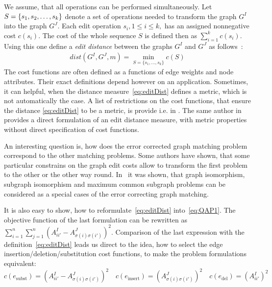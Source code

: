We assume, that all operations can be performed simultaneously. Let $S=\{s_1,s_2,\dots,\newline s_k\}$ denote a set of operations needed to transform the graph $G^I$ into the graph $G^J$. 
Each edit operation $s_i, 1\le i\le k,$ has an assigned nonnegative cost $c(s_i)$. The cost of the whole sequence $S$ is defined then as $\sum_{i=1}^{k}c(s_i)$. Using this one define a \emph{edit distance} between the graphs $G^I$ and $G^J$ as follows~\cite{Bunke1983_inexactGM, Wang1995}:
\begin{eqnarray} \label{eq:editDist}
dist(G^I,G^J,m) = \min\limits_{S=\{s_1,\dots,s_k\}}c(S)
\end{eqnarray}
The cost functions are often defined as a functions of edge weights and node attributes. Their exact definitions depend however on an application. Sometimes, it can helpful, when the distance measure~\eqref{eq:editDist} defines a metric, which is not automatically the case. A list of restrictions on the cost functions, that ensure the distance \eqref{eq:editDist} to be a metric, is provide i.e. in \cite{Bunke1983_inexactGM}. The same author in~\cite{Bunke1998_graphDist} provides a direct formulation of an edit distance measure, with metric properties without direct specification of cost functions.

An interesting question is, how does the error corrected graph matching problem correspond to the other matching problems. Some authors have shown, that some particular constrains on the graph edit costs allow to transform the first problem to the other or the other way round. In~\cite{Bunke1999_UnderlyingCosts} it was shown, that graph isomorphism, subgraph isomorphism and maximum common subgraph problems can be considered as a special cases of the error correcting graph matching. 

It is also easy to show, how to reformulate~\eqref{eq:editDist} into~\eqref{eq:QAP1}. The objective function of the last formulation can be rewritten as $\sum_{i=1}^n\sum_{j=1}^{n}(A^I_{ii'}-A^J_{\sigma(i)\sigma(i')})^2$. Comparison of the last expression with the definition~\eqref{eq:editDist} leads us direct to the idea, how to select the edge insertion/deletion/substitution cost functions, to make the problem formulations equivalent: 
\begin{equation*}
c(e_{\text{subst}})=(A^I_{ii'}-A^J_{\sigma(i)\sigma(i')})^2\quad c(e_{\text{insert}})=(A^J_{\sigma(i)\sigma(i')})^2\quad c(e_{\text{del}})=(A^I_{ii'})^2
\end{equation*}

